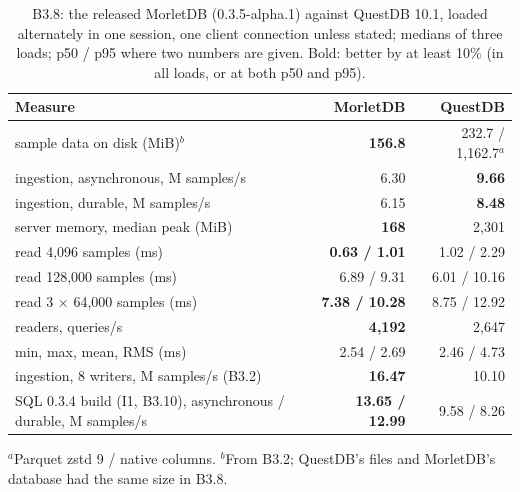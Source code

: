 \documentclass[sigconf,nonacm]{acmart}
\newcommand{\M}{MorletDB}
\begin{document}
\begin{table}[t]
\caption{B3.8: the released \M{} (0.3.5-alpha.1) against QuestDB 10.1, loaded alternately in one session, one client connection unless stated; medians of three loads; p50 / p95 where two numbers are given. Bold: better by at least 10\% (in all loads, or at both p50 and p95).}
\label{tab:b3}
\small\setlength{\tabcolsep}{3pt}
\begin{tabularx}{\linewidth}{@{}>{\raggedright\arraybackslash}Xrr@{}}
\toprule
Measure & \M{} & QuestDB \\
\midrule
sample data on disk (MiB)$^b$ & \textbf{156.8} & 232.7 / 1,162.7$^a$ \\
ingestion, asynchronous, M samples/s & 6.30 & \textbf{9.66} \\
ingestion, durable, M samples/s & 6.15 & \textbf{8.48} \\
server memory, median peak (MiB) & \textbf{168} & 2,301 \\
read 4,096 samples (ms) & \textbf{0.63 / 1.01} & 1.02 / 2.29 \\
read 128,000 samples (ms) & 6.89 / 9.31 & 6.01 / 10.16 \\
read 3 $\times$ 64,000 samples (ms) & \textbf{7.38 / 10.28} & 8.75 / 12.92 \\
4 readers, queries/s & \textbf{4,192} & 2,647 \\
min, max, mean, RMS (ms) & 2.54 / 2.69 & 2.46 / 4.73 \\
\midrule
ingestion, 8 writers, M samples/s (B3.2) & \textbf{16.47} & 10.10 \\
SQL 0.3.4 build (I1, B3.10), asynchronous / durable, M samples/s & \textbf{13.65 / 12.99} & 9.58 / 8.26 \\
\bottomrule
\end{tabularx}
\par\smallskip\footnotesize $^a$Parquet zstd 9 / native columns. $^b$From B3.2; QuestDB's files and \M{}'s database had the same size in B3.8.
\end{table}
\end{document}
